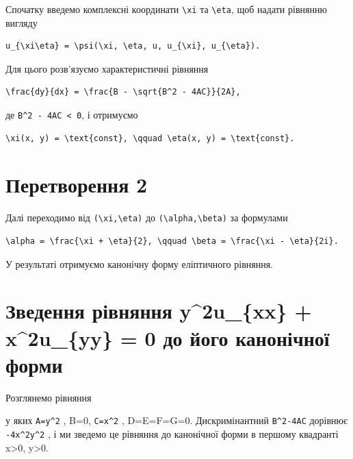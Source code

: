 \documentclass[
  ukrainian,
]{article}
\begin{document}
Спочатку введемо комплексні координати \texttt{\textbackslash{}xi} та
\texttt{\textbackslash{}eta}, щоб надати рівнянню вигляду

\begin{verbatim}
u_{\xi\eta} = \psi(\xi, \eta, u, u_{\xi}, u_{\eta}).
\end{verbatim}

Для цього розв'язуємо характеристичні рівняння

\begin{verbatim}
\frac{dy}{dx} = \frac{B - \sqrt{B^2 - 4AC}}{2A},
\end{verbatim}

де \texttt{B\^{}2\ -\ 4AC\ \textless{}\ 0}, і отримуємо

\begin{verbatim}
\xi(x, y) = \text{const}, \qquad \eta(x, y) = \text{const}.
\end{verbatim}

\section{Перетворення
2}\label{ux43fux435ux440ux435ux442ux432ux43eux440ux435ux43dux43dux44f-2}

Далі переходимо від \texttt{(\textbackslash{}xi,\textbackslash{}eta)} до
\texttt{(\textbackslash{}alpha,\textbackslash{}beta)} за формулами

\begin{verbatim}
\alpha = \frac{\xi + \eta}{2}, \qquad \beta = \frac{\xi - \eta}{2i}.
\end{verbatim}

У результаті отримуємо канонічну форму еліптичного рівняння.

\section{Зведення рівняння y\^{}2u\_\{xx\} + x\^{}2u\_\{yy\} = 0 до його
канонічної
форми}\label{ux437ux432ux435ux434ux435ux43dux43dux44f-ux440ux456ux432ux43dux44fux43dux43dux44f-y2u_xx-x2u_yy-0-ux434ux43e-ux439ux43eux433ux43e-ux43aux430ux43dux43eux43dux456ux447ux43dux43eux457-ux444ux43eux440ux43cux438}

Розглянемо рівняння

у яких \texttt{A=y\^{}2} , B=0, \texttt{C=x\^{}2} , D=E=F=G=0.
Дискримінантний \texttt{B\^{}2-4AC} дорівнює \texttt{-4x\^{}2y\^{}2} , і
ми зведемо це рівняння до канонічної форми в першому квадранті
x\textgreater0, y\textgreater0.
\end{document}
